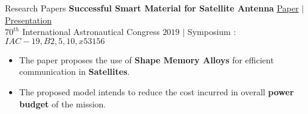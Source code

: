 \documentclass{resume} %
\begin{document}
\begin{rSection}{\Large Research Papers}
\textbf{Successful Smart Material for Satellite Antenna} \hfill \href{https://drive.google.com/file/d/1YOR9uqfb6u26wfn_2mWSKzRuJPBzu1Pr/view?usp=sharing}{Paper} \hspace{8px} $|$  \hspace{8px} \href{https://drive.google.com/file/d/135Rk7FCLyyEq9t4CmXiGp4LUtC35yo_E/view?usp=sharing}{Presentation} \vspace{4px}\\
$70^{th}$ International Astronautical Congress $2019$  $|$  Symposium : $ IAC-19,B2,5,10,x53156 $
\begin{itemize}
    \item The paper proposes the use of \textbf{Shape Memory Alloys} for efficient communication in \textbf{Satellites}.
    \item The proposed model intends to reduce the cost incurred in overall \textbf{power budget} of the mission.
\end{itemize}
\end{rSection} 

\end{document}
